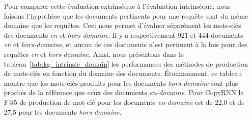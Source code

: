 




Pour comparer cette évaluation extrinsèque à l'évaluation intrinsèque, nous faisons l'hypothèse que les documents pertinents pour une requête sont du même domaine que les requêtes. Ceci nous permet d'évaluer séparément les mots-clés des documents \textit{en} et \textit{hors-domaine}.
Il y a respectivement 921 et 444 documents \textit{en} et \textit{hors-domaine}, et aucun de ces documents n'est pertinent à la fois pour des requêtes \textit{en} et \textit{hors-domaine}.
%
Ainsi, nous présentons dans le tableau~\ref{tab:kg_intrinsic_domain} les performances des méthodes de production de mots-clés en fonction du domaine des documents.
Étonnamment, ce tableau montre que les mots-clés produits pour les documents \textit{hors-domaine} sont plus proches de la référence que ceux des documents \textit{en-domaine}.
Pour CopyRNN la F@5 de production de mot-clé pour les documents \textit{en-domaine} est de 22,0 et de 27,5 pour les documents \textit{hors-domaine}.


